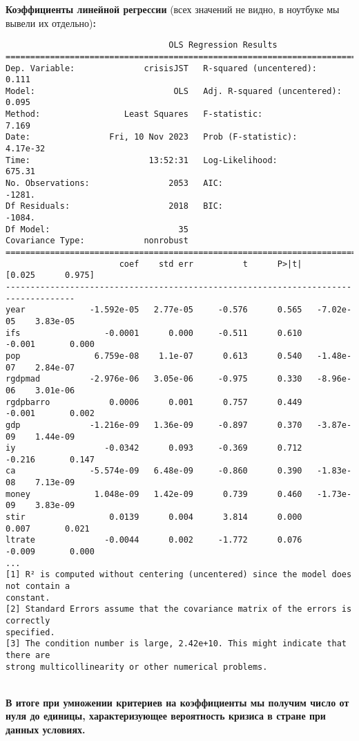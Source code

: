 \documentclass[12pt]{article}
\begin{document}
\textbf{Коэффициенты линейной регрессии} (всех значений не видно, в ноутбуке мы вывели их отдельно)\textbf{:}
\begin{verbatim}
                                 OLS Regression Results                                
=======================================================================================
Dep. Variable:              crisisJST   R-squared (uncentered):                   0.111
Model:                            OLS   Adj. R-squared (uncentered):              0.095
Method:                 Least Squares   F-statistic:                              7.169
Date:                Fri, 10 Nov 2023   Prob (F-statistic):                    4.17e-32
Time:                        13:52:31   Log-Likelihood:                          675.31
No. Observations:                2053   AIC:                                     -1281.
Df Residuals:                    2018   BIC:                                     -1084.
Df Model:                          35                                                  
Covariance Type:            nonrobust                                                  
====================================================================================
                       coef    std err          t      P>|t|      [0.025      0.975]
------------------------------------------------------------------------------------
year             -1.592e-05   2.77e-05     -0.576      0.565   -7.02e-05    3.83e-05
ifs                 -0.0001      0.000     -0.511      0.610      -0.001       0.000
pop               6.759e-08    1.1e-07      0.613      0.540   -1.48e-07    2.84e-07
rgdpmad          -2.976e-06   3.05e-06     -0.975      0.330   -8.96e-06    3.01e-06
rgdpbarro            0.0006      0.001      0.757      0.449      -0.001       0.002
gdp              -1.216e-09   1.36e-09     -0.897      0.370   -3.87e-09    1.44e-09
iy                  -0.0342      0.093     -0.369      0.712      -0.216       0.147
ca               -5.574e-09   6.48e-09     -0.860      0.390   -1.83e-08    7.13e-09
money             1.048e-09   1.42e-09      0.739      0.460   -1.73e-09    3.83e-09
stir                 0.0139      0.004      3.814      0.000       0.007       0.021
ltrate              -0.0044      0.002     -1.772      0.076      -0.009       0.000
...
[1] R² is computed without centering (uncentered) since the model does not contain a 
constant.
[2] Standard Errors assume that the covariance matrix of the errors is correctly 
specified.
[3] The condition number is large, 2.42e+10. This might indicate that there are
strong multicollinearity or other numerical problems.
\end{verbatim}
\\

\textbf{В итоге при умножении критериев на коэффициенты мы получим число от нуля до единицы, характеризующее вероятность кризиса в стране при данных условиях.}
\end{document}
